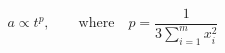 \begin{equation}
a\propto t^p, \qquad \textrm{where} \quad
p=\frac{1}{3\sum_{i=1}^{m}x_i^2}
\end{equation}

